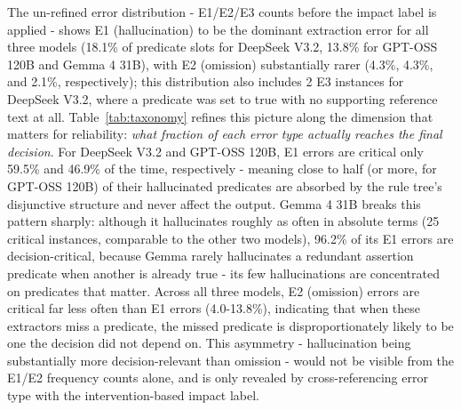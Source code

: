 The un-refined error distribution - E1/E2/E3 counts before the impact label is applied - shows E1 (hallucination) to be the dominant extraction error for all three models (18.1\% of predicate slots for DeepSeek V3.2, 13.8\% for GPT-OSS 120B and Gemma 4 31B), with E2 (omission) substantially rarer (4.3\%, 4.3\%, and 2.1\%, respectively); this distribution also includes 2 E3 instances for DeepSeek V3.2, where a predicate was set to true with no supporting reference text at all. Table~\ref{tab:taxonomy} refines this picture along the dimension that matters for reliability: \emph{what fraction of each error type actually reaches the final decision}. For DeepSeek V3.2 and GPT-OSS 120B, E1 errors are critical only 59.5\% and 46.9\% of the time, respectively - meaning close to half (or more, for GPT-OSS 120B) of their hallucinated predicates are absorbed by the rule tree's disjunctive structure and never affect the output. Gemma 4 31B breaks this pattern sharply: although it hallucinates roughly as often in absolute terms (25 critical instances, comparable to the other two models), 96.2\% of its E1 errors are decision-critical, because Gemma rarely hallucinates a redundant assertion predicate when another is already true - its few hallucinations are concentrated on predicates that matter. Across all three models, E2 (omission) errors are critical far less often than E1 errors (4.0-13.8\%), indicating that when these extractors miss a predicate, the missed predicate is disproportionately likely to be one the decision did not depend on. This asymmetry - hallucination being substantially more decision-relevant than omission - would not be visible from the E1/E2 frequency counts alone, and is only revealed by cross-referencing error type with the intervention-based impact label.
